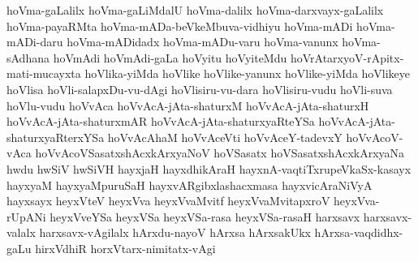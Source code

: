 {hoVma-gaLalilx
hoVma-gaLiMdalU
hoVma-dalilx
hoVma-darxvayx-gaLalilx
hoVma-payaRMta
hoVma-mADa-beVkeMbuva-vidhiyu
hoVma-mADi
hoVma-mADi-daru
hoVma-mADidadx
hoVma-mADu-varu
hoVma-vanunx
hoVma-sAdhana
hoVmAdi
hoVmAdi-gaLa
hoVyitu
hoVyiteMdu
hoVrAtarxyoV-rApitx-mati-mucayxta
hoVlika-yiMda
hoVlike
hoVlike-yanunx
hoVlike-yiMda
hoVlikeye
hoVlisa
hoVli-salapxDu-vu-dAgi
hoVlisiru-vu-dara
hoVlisiru-vudu
hoVli-suva
hoVlu-vudu
hoVvAca
hoVvAcA-jAta-shaturxM
hoVvAcA-jAta-shaturxH
hoVvAcA-jAta-shaturxmAR
hoVvAcA-jAta-shaturxyaRteYSa
hoVvAcA-jAta-shaturxyaRterxYSa
hoVvAcAhaM
hoVvAceVti
hoVvAceY-tadevxY
hoVvAcoV-vAca
hoVvAcoVSasatxshAcxkArxyaNoV
hoVSasatx
hoVSasatxshAcxkArxyaNa
hwdu
hwSiV
hwSiVH
hayxjaH
hayxdhikAraH
hayxnA-vaqtiTxrupeVkaSx-kasayx
hayxyaM
hayxyaMpuruSaH
hayxvARgibxlashacxmasa
hayxvicAraNiVyA
hayxsayx
heyxVteV
heyxVva
heyxVvaMvitf
heyxVvaMvitapxroV
heyxVva-rUpANi
heyxVveYSa
heyxVSa
heyxVSa-rasa
heyxVSa-rasaH
harxsavx
harxsavx-valalx
harxsavx-vAgilalx
hArxdu-nayoV
hArxsa
hArxsakUkx
hArxsa-vaqdidhx-gaLu
hirxVdhiR
horxVtarx-nimitatx-vAgi
}
